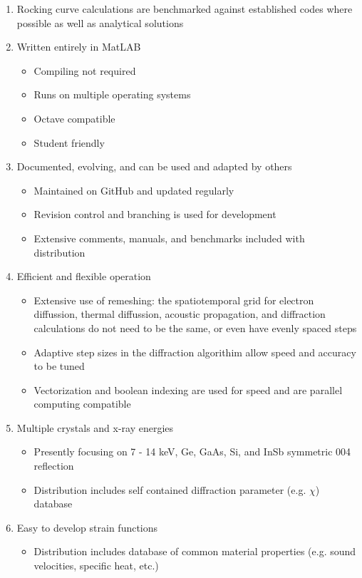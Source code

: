 \documentclass[letterpaper,11pt]{article}
\begin{document}
\begin{enumerate}
\item{Rocking curve calculations are benchmarked against established codes where possible as well as analytical solutions}
\item{Written entirely in MatLAB}
\begin{itemize}
\item{Compiling not required}
\item{Runs on multiple operating systems}
\item{Octave compatible}
\item{Student friendly}
\end{itemize}
\item{Documented, evolving, and can be used and adapted by others}
\begin{itemize}
\item{Maintained on GitHub and updated regularly}
\item{Revision control and branching is used for development}
\item{Extensive comments, manuals, and benchmarks included with distribution}
\end{itemize}
\item{Efficient and flexible operation}
\begin{itemize}
\item{Extensive use of remeshing: the spatiotemporal grid for electron diffussion, thermal diffussion, acoustic propagation, and diffraction calculations do not need to be the same, or even have evenly spaced steps}
\item{Adaptive step sizes in the diffraction algorithim allow speed and accuracy to be tuned}
\item{Vectorization and boolean indexing are used for speed and are parallel computing compatible}
\end{itemize}
\item{Multiple crystals and x-ray energies}
\begin{itemize}
\item{Presently focusing on 7 - 14 keV, Ge, GaAs, Si, and InSb symmetric 004 reflection}
\item{Distribution includes self contained diffraction parameter (e.g. $\chi$) database}
\end{itemize}
\item{Easy to develop strain functions}
\begin{itemize}
\item{Distribution includes database of common material properties (e.g. sound velocities, specific heat, etc.)}
\end{itemize}
\end{enumerate}
\end{document}
